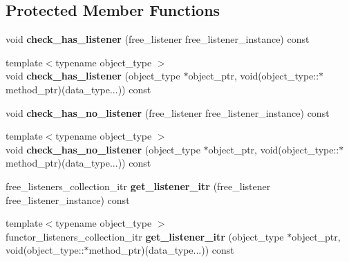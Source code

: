 \subsection*{Protected Member Functions}
\begin{DoxyCompactItemize}
\item 
\hypertarget{classxstd_1_1event_a3b2ec0fe63b51f0a785663ff1cbaf897}{void {\bfseries check\-\_\-has\-\_\-listener} (free\-\_\-listener free\-\_\-listener\-\_\-instance) const }\label{classxstd_1_1event_a3b2ec0fe63b51f0a785663ff1cbaf897}

\item 
\hypertarget{classxstd_1_1event_a4c8f61670b0145de08594411dab17b49}{{\footnotesize template$<$typename object\-\_\-type $>$ }\\void {\bfseries check\-\_\-has\-\_\-listener} (object\-\_\-type $\ast$object\-\_\-ptr, void(object\-\_\-type\-::$\ast$method\-\_\-ptr)(data\-\_\-type...)) const }\label{classxstd_1_1event_a4c8f61670b0145de08594411dab17b49}

\item 
\hypertarget{classxstd_1_1event_a8720bdcd9e0e8588eadbca2750f751e0}{void {\bfseries check\-\_\-has\-\_\-no\-\_\-listener} (free\-\_\-listener free\-\_\-listener\-\_\-instance) const }\label{classxstd_1_1event_a8720bdcd9e0e8588eadbca2750f751e0}

\item 
\hypertarget{classxstd_1_1event_a38563e182cb13274550c790f6c2d48e1}{{\footnotesize template$<$typename object\-\_\-type $>$ }\\void {\bfseries check\-\_\-has\-\_\-no\-\_\-listener} (object\-\_\-type $\ast$object\-\_\-ptr, void(object\-\_\-type\-::$\ast$method\-\_\-ptr)(data\-\_\-type...)) const }\label{classxstd_1_1event_a38563e182cb13274550c790f6c2d48e1}

\item 
\hypertarget{classxstd_1_1event_ac5c004598aa8803f901597ade5aec2c2}{free\-\_\-listeners\-\_\-collection\-\_\-itr {\bfseries get\-\_\-listener\-\_\-itr} (free\-\_\-listener free\-\_\-listener\-\_\-instance) const }\label{classxstd_1_1event_ac5c004598aa8803f901597ade5aec2c2}

\item 
\hypertarget{classxstd_1_1event_a56491edd13a1c81766c8c770464e992a}{{\footnotesize template$<$typename object\-\_\-type $>$ }\\functor\-\_\-listeners\-\_\-collection\-\_\-itr {\bfseries get\-\_\-listener\-\_\-itr} (object\-\_\-type $\ast$object\-\_\-ptr, void(object\-\_\-type\-::$\ast$method\-\_\-ptr)(data\-\_\-type...)) const }\label{classxstd_1_1event_a56491edd13a1c81766c8c770464e992a}


\end{DoxyCompactItemize}
